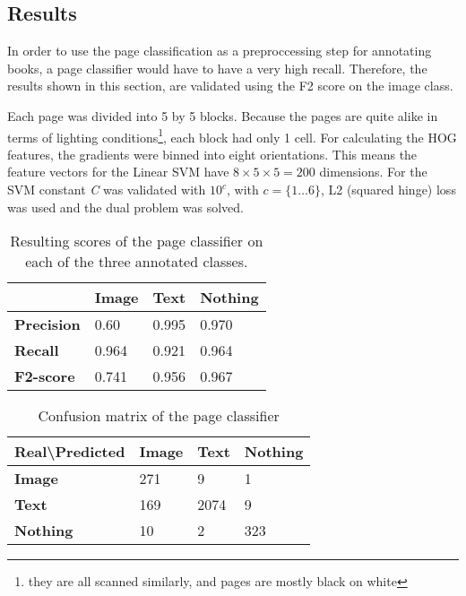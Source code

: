 \subsection{Results}
\label{subsec:pageclasresults}

In order to use the page classification as a preproccessing step for annotating
books, a page classifier would have to have a very high recall. Therefore, the
results shown in this section, are validated using the F2 score on the image
class. 

Each page was divided into 5 by 5 blocks. Because the pages
are quite alike in terms of lighting conditions\footnote{they are all scanned
similarly, and pages are mostly black on white}, each block had only 1 cell. For
calculating the HOG features, the gradients were binned into eight orientations.
This means the feature vectors for the Linear SVM have $8 \times 5 \times 5 =
200$ dimensions. 
For the SVM constant \emph{C} was validated with $10^c$, with $c = \{1 \dots
6\}$, L2 (squared hinge) loss was used and the dual problem was solved. 

\begin{table}
\centering
\begin{tabular}{l l l l}
\hline
  & \textbf{Image} & \textbf{Text} & \textbf{Nothing} \\\hline
\textbf{Precision} & 0.60  & 0.995 & 0.970 \\
\textbf{Recall} & 0.964  & 0.921 & 0.964 \\
\textbf{F2-score} & 0.741 & 0.956 & 0.967 \\\hline
\end{tabular}
\caption{Resulting scores of the page classifier on each of the three annotated
classes.}
\label{tab:pageclasresults}
\end{table}

\begin{table}
\centering
\begin{tabular}{l l l l}
\hline
Real\textbackslash Predicted & \textbf{Image} & \textbf{Text} & \textbf{Nothing} \\\hline
\textbf{Image} & 271 & 9 & 1 \\
\textbf{Text} & 169 & 2074 & 9 \\
\textbf{Nothing} & 10 & 2 & 323\\
\hline
\end{tabular}
\caption{Confusion matrix of the page classifier}
\label{tab:pageclascm}
\end{table}

